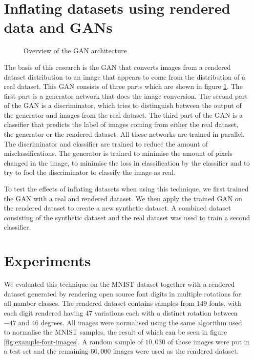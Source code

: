 \documentclass[10pt,twocolumn,letterpaper]{article}
\begin{document}
\section{Inflating datasets using rendered data and GANs}

\begin{figure}[h]
\begin{center}
{\scriptsize }
\end{center}
   \caption{Overview of the GAN architecture}
\label{fig:gan-architecture}
\end{figure}

The basis of this research is the GAN that converts images from a rendered dataset distribution to an image that appears to come from the distribution of a real dataset. This GAN consists of three parts which are shown in figure \ref{fig:gan-architecture}. The first part is a generator network that does the image conversion. The second part of the GAN is a discriminator, which tries to distinguish between the output of the generator and images from the real dataset. The third part of the GAN is a classifier that predicts the label of images coming from either the real dataset, the generator or the rendered dataset. All these networks are trained in parallel. The discriminator and classifier are trained to reduce the amount of misclassifications. The generator is trained to minimise the amount of pixels changed in the image, to minimise the loss in classification by the classifier and to try to fool the discriminator to classify the image as real.

To test the effects of inflating datasets when using this technique, we first trained the GAN with a real and rendered dataset. We then apply the trained GAN on the rendered dataset to create a new synthetic dataset. A combined dataset consisting of the synthetic dataset and the real dataset was used to train a second classifier.

\section{Experiments}


We evaluated this technique on the MNIST dataset \cite{mnist} together with a rendered dataset generated by rendering open source font digits in multiple rotations for all number classes.
The rendered dataset contains samples from $149$ fonts, with each digit rendered having $47$ variations each with a distinct rotation between $-47$ and $46$ degrees. All images were normalised using the same algorithm used to normalise the MNIST samples, the result of which can be seen in figure \ref{fig:example-font-images}. A random sample of $10,030$ of those images were put in a test set and the remaining $60,000$ images were used as the rendered dataset.
\end{document}

